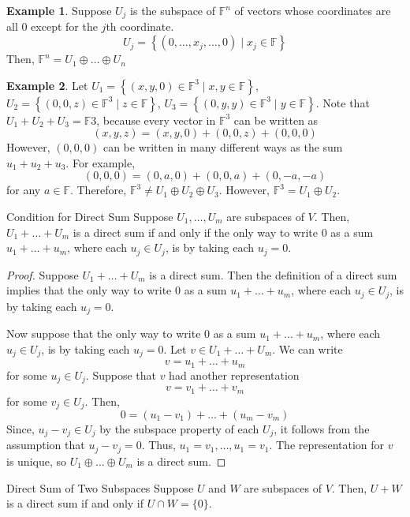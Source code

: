 \documentclass{book}
\newcommand{\field}{\mathbb{F}}
\newcommand{\set}[2]{\left\{#1\;\vert\;#2\right\}}
\theoremstyle{definition}
\newtheorem*{example}{Example}
\begin{document}
\begin{example}
    Suppose $U_j$ is the subspace of $\field^n$ of vectors whose coordinates are
    all 0 except for the $j$th coordinate.
    \[
        U_j = \set{(0,\dots,x_j,\dots,0)}{x_j\in\field} 
    \]
    Then, $\field^n = U_1\oplus\dots\oplus U_n$ 
\end{example}

\begin{example}
    Let $U_1 = \set{(x,y,0)\in\field^3}{x,y\in\field}$, $U_2 =
    \set{(0,0,z)\in\field^3}{z\in\field}$, $U_3 = \set{(0,y,y) 
    \in\field^3}{y\in\field}$. Note that $U_1+U_2+U_3 = \field 3$, because every
    vector in $\field^3$ can be written as 
    \[
        (x,y,z) = (x,y,0) + (0,0,z) + (0,0,0)
    \]
    However, $(0,0,0)$ can be written in many different ways as the sum
    $u_1+u_2+u_3$. For example,
    \[
        (0,0,0) = (0,a,0)+(0,0,a)+(0,-a,-a)
    \]
    for any $a\in\field$. Therefore, $\field^3 \neq U_1 \oplus U_2 \oplus U_3$.
    However, $\field^3 = U_1 \oplus U_2$.
\end{example}

\begin{thm}{Condition for Direct Sum}
    Suppose $U_1,\dots,U_m$ are subspaces of $V$. Then, $U_1+\dots+U_m$ is a
    direct sum if and only if the only way to write 0 as a sum $u_1+\dots+u_m$, 
    where each $u_j\in U_j$, is by taking each $u_j=0$.
\end{thm}

\begin{proof}
    Suppose $U_1+\dots+U_m$ is a direct sum. Then the definition of a direct sum
    implies that the only way to write 0 as a sum $u_1+\dots+u_m$, where each
    $u_j\in U_j$, is by taking each $u_j=0$.

    Now suppose that the only way to write 0 as a sum $ u_1+\dots+u_m$, where
    each $u_j\in U_j$, is by taking each $u_j=0$. Let $v\in U_1+\dots+U_m$. We
    can write
    \[
        v = u_1+\dots+u_m
    \]
    for some $u_j\in U_j$. Suppose that $v$ had another representation
    \[
        v = v_1+\dots+v_m
    \]
    for some $v_j \in U_j$. Then,
    \[
        0 = (u_1-v_1)+\dots+(u_m-v_m)
    \]
    Since, $u_j-v_j \in U_j$ by the subspace property of each $U_j$, it follows
    from the assumption that $u_j-v_j=0$. Thus, $u_1=v_1,\dots,u_1=v_1$. The
    representation for $v$ is unique, so $U_1\oplus\dots\oplus U_m$ is a direct
    sum.
\end{proof}

\begin{thm}{Direct Sum of Two Subspaces}
    Suppose $U$ and $W$ are subspaces of $V$. Then, $U+W$ is a direct sum if and
    only if $U\cap W = \{0\}$.
\end{thm}
\end{document}
